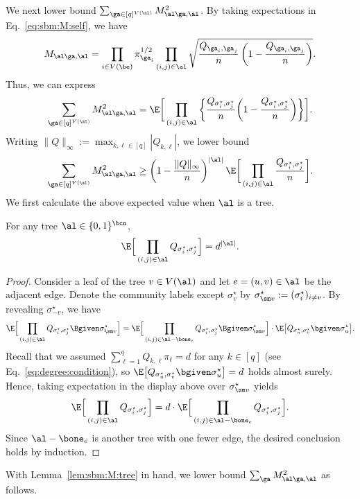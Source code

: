 \documentclass[11pt]{article}
\begin{document}
We next lower bound $\sum_{\ga\in [q]^{V(\al)}}M_{\al\ga,\al}^2$. By taking expectations in Eq.~\eqref{eq:sbm:M:self}, we have
\[
M_{\al\ga,\al}=\prod_{i \in V(\be)}\pi_{\ga_i}^{1/2}\prod_{(i,j)\in \al}\sqrt{\frac{Q_{\ga_i,\ga_j}}{n}\left(1-\frac{Q_{\ga_i,\ga_j}}{n}\right)}.
\]
Thus, we can express
\[
\sum_{\ga\in [q]^{V(\al)}}M_{\al\ga,\al}^2=\E\bigg[ \prod_{(i,j)\in\al} \bigg\{\frac{Q_{\sigma^\star_i,\sigma^\star_j}}{n}\bigg(1-\frac{Q_{\sigma^\star_i,\sigma^\star_j}}{n}\bigg)\bigg\}\bigg].
\]
Writing $\|Q\|_{\infty}:=\max_{k,\ell\in [q]}|Q_{k,\ell}|$, we lower bound
\begin{equation}\label{eq:sbm:M:lower:bound}
\sum_{\ga\in [q]^{V(\al)}}M_{\al\ga,\al}^2\geq \left(1-\frac{\|Q\|_{\infty}}{n}\right)^{|\al|} \E\bigg[\prod_{(i,j)\in \al}\frac{Q_{\sigma^\star_i,\sigma^\star_j}}{n}\bigg].
\end{equation}
We first calculate the above expected value when $\al$ is a tree.
\begin{lemma}\label{lem:sbm:M:tree}
    For any tree $\al\in \{0,1\}^{\bcn}$,
    \[
    \E\Big[\prod_{(i,j)\in \al}Q_{\sigma^\star_i,\sigma^\star_j}\Big]=d^{|\al|}.
    \]
\end{lemma}
\begin{proof}
    Consider a leaf of the tree $v\in V(\al)$ and let $e=(u,v)\in \al$ be the adjacent edge. Denote the community labels except $\sigma^\star_{v}$ by $\sigma^\star_{\sm v}:=(\sigma^\star_i)_{i\neq v}$. By revealing $\sigma^\star_{-v}$, we have
    \[
     \E\Big[\prod_{(i,j)\in \al}Q_{\sigma^\star_i,\sigma^\star_j}\Bgiven \sigma^\star_{\sm v}\Big]=\E\Big[\prod_{(i,j)\in \al-\bone_e}Q_{\sigma^\star_i,\sigma^\star_j}\Bgiven \sigma^\star_{\sm v}\Big]\cdot \E\big[Q_{\sigma^\star_u,\sigma^\star_v}\bgiven \sigma^\star_u\big]. 
    \]
    Recall that we assumed $\sum_{\ell=1}^{q}Q_{k,\ell}\pi_{\ell}=d$ for any $k\in [q]$ (see Eq.~\eqref{eq:degree:condition}), so $\E\big[Q_{\sigma^\star_u,\sigma^\star_v}\bgiven \sigma^\star_u\big]=d$ holds almost surely. Hence, taking expectation in the display above over $\sigma^\star_{\sm v}$ yields
    \[
      \E\Big[\prod_{(i,j)\in \al}Q_{\sigma^\star_i,\sigma^\star_j}\Big]=d\cdot \E\Big[\prod_{(i,j)\in \al-\bone_e}Q_{\sigma^\star_i,\sigma^\star_j}\Big].
    \]
    Since $\al-\bone_{e}$ is another tree with one fewer edge, the desired conclusion holds by induction.
\end{proof}
With Lemma~\ref{lem:sbm:M:tree} in hand, we lower bound $\sum_{\ga} M_{\al\ga,\al}^2$ as follows.
\end{document}
